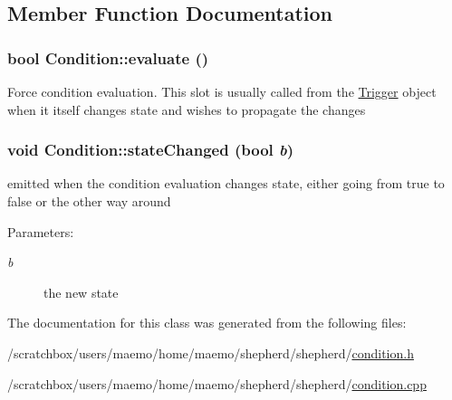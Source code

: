 \subsection{Member Function Documentation}
\hypertarget{class_condition_1ed8dccd3394ae01378788f66f072f8f}{
\subsubsection[{evaluate}]{\setlength{\rightskip}{0pt plus 5cm}bool Condition::evaluate ()}}
\label{class_condition_1ed8dccd3394ae01378788f66f072f8f}


Force condition evaluation. This slot is usually called from the \hyperlink{interface_trigger}{Trigger} object when it itself changes state and wishes to propagate the changes \hypertarget{class_condition_edef85651f9da74dc23c179a2bebcae9}{
\subsubsection[{stateChanged}]{\setlength{\rightskip}{0pt plus 5cm}void Condition::stateChanged (bool {\em b})}}
\label{class_condition_edef85651f9da74dc23c179a2bebcae9}


emitted when the condition evaluation changes state, either going from true to false or the other way around

\begin{Desc}
\item[Parameters:]
\begin{description}
\item[{\em b}]the new state \end{description}
\end{Desc}


The documentation for this class was generated from the following files:\begin{CompactItemize}
\item 
/scratchbox/users/maemo/home/maemo/shepherd/shepherd/\hyperlink{condition_8h}{condition.h}\item 
/scratchbox/users/maemo/home/maemo/shepherd/shepherd/\hyperlink{condition_8cpp}{condition.cpp}\end{CompactItemize}
